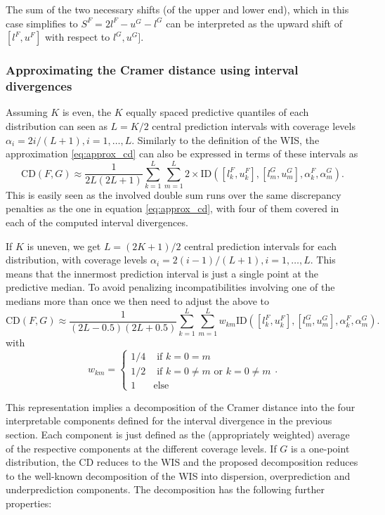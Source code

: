 \documentclass[
]{article}
\begin{document}
The sum of the two necessary shifts (of the upper and lower end), which
in this case simplifies to \(S^F = 2l^F - u^G -l^G\) can be interpreted
as the upward shift of \([l^F, u^F]\) with respect to \(l^G, u^G]\).

\hypertarget{approximating-the-cramer-distance-using-interval-divergences-1}{%
\subsubsection{Approximating the Cramer distance using interval
divergences}\label{approximating-the-cramer-distance-using-interval-divergences-1}}

Assuming \(K\) is even, the \(K\) equally spaced predictive quantiles of
each distribution can seen as \(L = K/2\) central prediction intervals
with coverage levels \(\alpha_i = 2i/(L + 1), i = 1, \dots, L\).
Similarly to the definition of the WIS, the approximation
\eqref{eq:approx_cd} can also be expressed in terms of these intervals
as \[
\text{CD}(F, G) \approx \frac{1}{2L(2L + 1)}\sum_{k = 1}^L\sum_{m = 1}^L 2 \times \text{ID}([l^F_k, u^F_k], [l^G_m, u^G_m], \alpha_k^F, \alpha_m^G).
\] This is easily seen as the involved double sum runs over the same
discrepancy penalties as the one in equation \eqref{eq:approx_cd}, with
four of them covered in each of the computed interval divergences.

If \(K\) is uneven, we get \(L = (2K + 1)/2\) central prediction
intervals for each distribution, with coverage levels
\(\alpha_i = 2(i - 1)/(L + 1), i = 1, \dots, L\). This means that the
innermost prediction interval is just a single point at the predictive
median. To avoid penalizing incompatibilities involving one of the
medians more than once we then need to adjust the above to
\begin{equation}
\text{CD}(F, G) \approx \frac{1}{(2L - 0.5)(2L + 0.5)}\sum_{k = 1}^L\sum_{m = 1}^L w_{km}\text{ID}([l^F_k, u^F_k], [l^G_m, u^G_m], \alpha_k^F, \alpha_m^G).
\end{equation} with \[
w_{km} = \begin{cases} 1/4 & \text{ if } k = 0 = m \\
1/2 & \text{ if } k = 0 \neq m \text{ or } k = 0 \neq m\\
1 & \text{else}
\end{cases}.
\]

This representation implies a decomposition of the Cramer distance into
the four interpretable components defined for the interval divergence in
the previous section. Each component is just defined as the
(appropriately weighted) average of the respective components at the
different coverage levels. If \(G\) is a one-point distribution, the CD
reduces to the WIS and the proposed decomposition reduces to the
well-known decomposition of the WIS into dispersion, overprediction and
underprediction components. The decomposition has the following further
properties:
\end{document}
